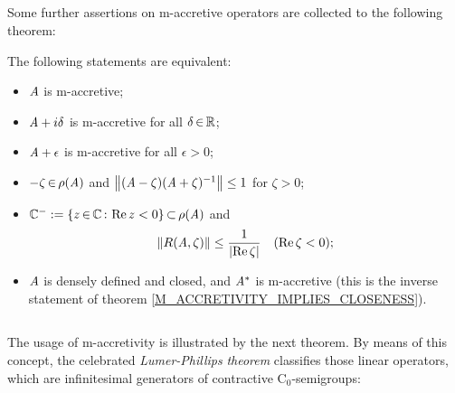\documentclass[11pt,twoside]{article}
\begin{document}

\subparagraph{}
Some further assertions on m-accretive operators are collected
to the following theorem:

\begin{theorem}
The following statements are equivalent:
\begin{itemize}[leftmargin=9mm,itemsep=2pt]
\item[(a)] $\mathit{A}$ is m-accretive;
\item[(b)] $\mathit{A} + i\delta$ is m-accretive for all $\delta {\,\in\,} {\mathbb{R}}$;
\item[(c)] $\mathit{A} + \epsilon$ is m-accretive for all $\epsilon > 0$;
\item[(d)] $-\zeta {\,\in\,} \rho(\mathit{A})$ and
           $\left\lVert (\mathit{A}-\zeta)(\mathit{A}+\zeta)^{-1} \right\rVert \leq 1$ for $\zeta > 0$;
\item[(e)] ${\mathbb{C}}^- := \{z {\,\in\,} {\mathbb{C}} {\,:\,} \operatorname{Re} z < 0\} {\,\subset\,} \rho(\mathit{A})$ and
           \[ \norm{R(\linA,\zeta)} \leq \frac{1}{\abs{\re \zeta} }
             \quad (\re \zeta < 0);
           \] 
\item[(f)] $\mathit{A}$ is densely defined and closed, and $\mathit{A}^*$ is m-accretive
           (this is the inverse statement of theorem
           \ref{M_ACCRETIVITY_IMPLIES_CLOSENESS}).
\end{itemize}
\end{theorem}

\subsection{} %
The usage of m-accretivity is illustrated by the next theorem.
By means of this concept,
the celebrated \textit{Lumer-Phillips} \textit{theorem}
classifies those linear operators,
which are infinitesimal generators of contractive C$_0$-semigroups:
\end{document}
